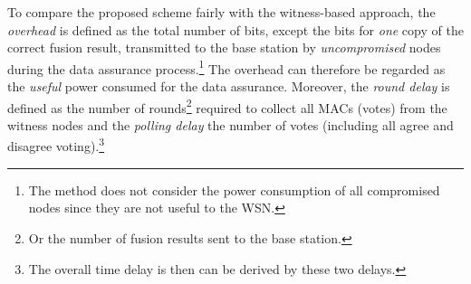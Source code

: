 \documentclass[12pt, onecolumn, draftcls]{IEEEtran}
\begin{document}
To compare the proposed scheme fairly with the witness-based
approach, the {\it overhead} is defined as the total number of bits,
except the bits for {\it one} copy of the correct fusion result,
transmitted to the base station by {\it uncompromised} nodes during
the data assurance process.\footnote{The method does not consider
the power consumption of all compromised nodes since they are not
useful to the WSN.} The overhead can therefore be regarded as the
{\it useful} power consumed for the data assurance. Moreover, the
{\it round delay} is defined as the number of rounds\footnote{Or the
number of fusion results sent to the base station.} required to
collect all MACs (votes) from the witness nodes and the {\it polling
delay} the number of votes (including all agree and disagree
voting).\footnote{The overall time delay is then can be derived by
these two delays.}
\end{document}
